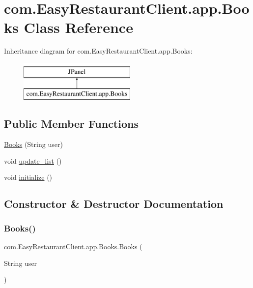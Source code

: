 \hypertarget{classcom_1_1_easy_restaurant_client_1_1app_1_1_books}{}\section{com.\+Easy\+Restaurant\+Client.\+app.\+Books Class Reference}
\label{classcom_1_1_easy_restaurant_client_1_1app_1_1_books}
Inheritance diagram for com.\+Easy\+Restaurant\+Client.\+app.\+Books\+:\begin{figure}[H]
\begin{center}
\leavevmode
\includegraphics[height=2.000000cm]{classcom_1_1_easy_restaurant_client_1_1app_1_1_books}
\end{center}
\end{figure}
\subsection*{Public Member Functions}
\begin{DoxyCompactItemize}
\item 
\mbox{\hyperlink{classcom_1_1_easy_restaurant_client_1_1app_1_1_books_a302b5a6e5c0123061a7a8c682ca9a196}{Books}} (String user)
\item 
void \mbox{\hyperlink{classcom_1_1_easy_restaurant_client_1_1app_1_1_books_ac3065fa01d5548d7be56bebcb21434b1}{update\+\_\+list}} ()
\item 
void \mbox{\hyperlink{classcom_1_1_easy_restaurant_client_1_1app_1_1_books_a6e7d85012ac1c655fcafe0e8c50eb498}{initialize}} ()
\end{DoxyCompactItemize}


\subsection{Constructor \& Destructor Documentation}
\mbox{\label{classcom_1_1_easy_restaurant_client_1_1app_1_1_books_a302b5a6e5c0123061a7a8c682ca9a196}} 
\subsubsection{\texorpdfstring{Books()}{Books()}}
{\footnotesize\ttfamily com.\+Easy\+Restaurant\+Client.\+app.\+Books.\+Books (\begin{DoxyParamCaption}\item[{String}]{user }\end{DoxyParamCaption})}

